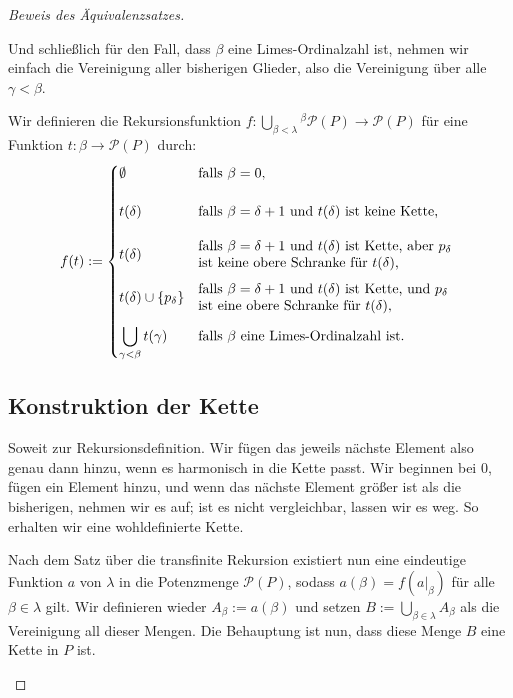 \begin{proof}[Beweis des Äquivalenzsatzes]
\begin{spoken-clean}[01:15:50 - 01:18:35]
Und schließlich für den Fall, dass $\beta$ eine Limes-Ordinalzahl ist, nehmen wir einfach die Vereinigung aller bisherigen Glieder, also die Vereinigung über alle $\gamma < \beta$.
\end{spoken-clean}

\begin{math-stroke}
Wir definieren die Rekursionsfunktion $f \colon \bigcup_{\beta < \lambda} {}^{\displaystyle \beta}\!\mathcal{P}(P) \to \mathcal{P}(P)$ für eine Funktion $t \colon \beta \to \mathcal{P}(P)$ durch:
\begin{equation}\label{eq:kzl-rekursion-f-actual}
f(t) := \begin{cases}
\emptyset & \text{falls } \beta = 0, \\[1.3em]
t(\delta) & \parbox{0.54\textwidth}{\raggedright falls $\beta = \delta + 1$ und $t(\delta)$ ist keine Kette,} \\[1.3em]
t(\delta) & \parbox{0.54\textwidth}{\raggedright falls $\beta = \delta + 1$ und $t(\delta)$ ist Kette, aber $p_\delta$ ist keine obere Schranke für $t(\delta)$,} \\[1.3em]
t(\delta) \cup \{p_\delta\} & \parbox{0.54\textwidth}{\raggedright falls $\beta = \delta + 1$ und $t(\delta)$ ist Kette, und $p_\delta$ ist eine obere Schranke für $t(\delta)$,} \\[1.3em]
\displaystyle\bigcup_{\gamma < \beta} t(\gamma) & \text{falls } \beta \text{ eine Limes-Ordinalzahl ist}.
\end{cases}
\end{equation}
\end{math-stroke}

\subsection{Konstruktion der Kette}
\begin{spoken-clean}[01:18:35 - 01:21:38]
Soweit zur Rekursionsdefinition. Wir fügen das jeweils nächste Element also genau dann hinzu, wenn es harmonisch in die Kette passt. Wir beginnen bei $0$, fügen ein Element hinzu, und wenn das nächste Element größer ist als die bisherigen, nehmen wir es auf; ist es nicht vergleichbar, lassen wir es weg. So erhalten wir eine wohldefinierte Kette.

Nach dem Satz über die transfinite Rekursion existiert nun eine eindeutige Funktion $a$ von $\lambda$ in die Potenzmenge $\mathcal{P}(P)$, sodass $a(\beta) = f(a|_{\beta})$ für alle $\beta \in \lambda$ gilt. Wir definieren wieder $A_\beta := a(\beta)$ und setzen $B := \bigcup_{\beta \in \lambda} A_\beta$ als die Vereinigung all dieser Mengen. Die Behauptung ist nun, dass diese Menge $B$ eine Kette in $P$ ist.
\end{spoken-clean}


\end{proof}
